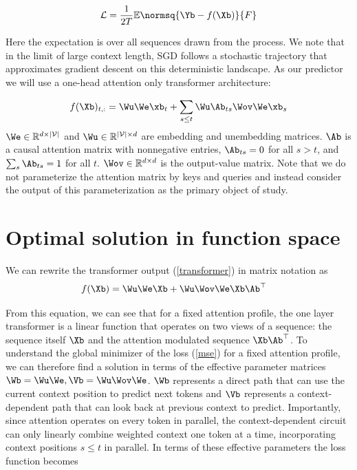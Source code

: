 \documentclass{article}
\begin{document}
\begin{equation}\label{mse}
    \mathcal{L} = \frac{1}{2T} \mathbb{E}\normsq{\Yb - f(\Xb)}{F}
\end{equation}

Here the expectation is over all sequences drawn from the process. We note that in the limit of large context length, SGD follows a stochastic trajectory that approximates gradient descent on this deterministic landscape. As our predictor we will use a one-head attention only transformer architecture: 

\begin{equation}\label{transformer}
    f(\Xb)_{t,:} = \Wu\We \xb_t + \sum_{s \le t} \Wu \Ab_{ts}\Wov\We \xb_s
\end{equation}
$\We \in \mathbb{R}^{d \times |\mathcal{V}|}$ and $\Wu \in \mathbb{R}^{|\mathcal{V}|\times d}$ are embedding and unembedding matrices. $\Ab$ is a causal attention matrix with nonnegative entries,  $\Ab_{ts} = 0$ for all $s > t$, and $\sum_{s} \Ab_{ts} = 1$ for all $t$. $\Wov \in \mathbb{R}^{d \times d}$ is the output-value matrix. Note that we do not parameterize the attention matrix by keys and queries and instead consider the output of this parameterization as the primary object of study. 

\section{Optimal solution in function space}
We can rewrite the transformer output (\ref{transformer}) in matrix notation as
\begin{align}\label{transformer_matrix}
     f(\Xb) &= \Wu\We \Xb + \Wu \Wov\We \Xb \Ab^\top
\end{align}

From this equation, we can see that for a fixed attention profile, the one layer transformer is a linear function that operates on two views of a sequence: the sequence itself $\Xb$ and the attention modulated sequence $\Xb\Ab^\top$. To understand the global minimizer of the loss (\ref{mse}) for a fixed attention profile, we can therefore find a solution in terms of the effective parameter matrices $\Wb = \Wu\We, \Vb = \Wu \Wov\We$. $\Wb$ represents a direct path that can use the current context position to predict next tokens and $\Vb$ represents a context-dependent path that can look back at previous context to predict. Importantly, since attention operates on every token in parallel, the context-dependent circuit can only linearly combine weighted context one token at a time, incorporating context positions $s \le t$ in parallel. In terms of these effective parameters the loss function becomes
\end{document}
